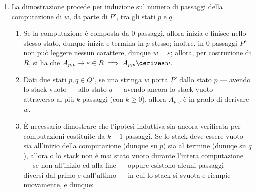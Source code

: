 \documentclass[a4paper, 12pt]{report}
\begin{document}
{\begin{enumerate}[label=]
\begin{enumerate}[label=]
\begin{itemize}
                                allora $w$ è in grado di portare $P'$ dallo stato $p$ allo stato $q$, lasciando invariato lo stack.
                            \item differentemente, nel secondo caso, siano $y$ e $z$ sottostringhe di $w$ generate rispettivamente da $A_{p, r}$ ed $A_{r, q}$ dunque $\soe{l}{A_{p,r} \derives y \\ A_{r,q} \derives z} \implies w = yz$, e si noti che $y$ e $z$ sono state derivate con $k$ passaggi; allora, per ipotesi induttiva forte, $y$ e $z$ portano, rispettivamente, $P'$ dagli stati $p$ ed $r$ --- avendo lo stack vuoto --- agli stati $r$ e $q$ --- avendo ancora lo stack vuoto; allora, $w$ è in grado di portare $P'$ dallo stato $p$ allo stato $q$, lasciando invariato lo stack.
                        \end{itemize}
                \end{enumerate}
            \item {} La dimostrazione procede per induzione sul numero di passaggi della computazione di $w$, da parte di $P'$, tra gli stati $p$ e $q$.
                \begin{enumerate}[label=]
                    \item {} Se la computazione è composta da 0 passaggi, allora inizia e finisce nello stesso stato, dunque inizia e termina in $p$ stesso; inoltre, in 0 passaggi $P'$ non può leggere nessun carattere, dunque $w = \varepsilon$; allora, per costruzione di $R$, si ha che $A_{p,p} \to \varepsilon \in R \implies A_{p,p} \derives w$.
                    \item {} Dati due stati $p, q \in Q'$, se una stringa $w$ porta $P'$ dallo stato $p$ --- avendo lo stack vuoto --- allo stato $q$ --- avendo ancora lo stack vuoto --- attraverso al più $k$ passaggi (con $k \ge 0$), allora $A_{p,q}$ è in grado di derivare $w$.
                    \item {} È necessario dimostrare che l'ipotesi induttiva sia ancora verificata per computazioni costituite da $k + 1$ passaggi. Se lo stack deve essere vuoto sia all'inizio della computazione (dunque su $p$) sia al termine (dunuqe su $q$), allora o lo stack non è mai stato vuoto durante l'intera computazione --- se non all'inizio ed alla fine --- oppure esistono alcuni passaggi --- diversi dal primo e dall'ultimo --- in cui lo stack si svuota e riempie nuovamente, e dunque:


\end{enumerate}
\end{enumerate}}
\end{document}
